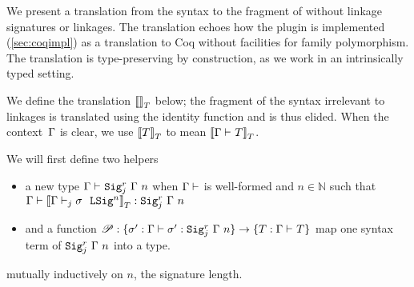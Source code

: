 We present a translation from the \TT syntax to the fragment of \TT without
linkage signatures or linkages.
The translation echoes how the \Lang plugin is implemented (\cref{sec:coqimpl})
as a translation to Coq without facilities for family polymorphism.
The translation is type-preserving by construction, as we work in an
intrinsically typed setting.

%
 


We define the translation $\denotesT{}$ below; the fragment of the syntax
irrelevant to linkages is translated using the identity function and is thus elided.
When the context~$\Gm$ is clear, we use $\denotesT{T}$ to mean $\denotesT{\goodType{\Gamma}{T}{}}$.

We will first define two helpers
\begin{itemize}
  \item a new type $\goodType{\Gamma}{\Sigr{\Gamma}{n}{j}}{}$  when
  $\goodCtx{\Gamma}{}$  is well-formed and $n \in \mathbb{N}$
  such that $\goodTerm{\Gm}{\denotesT{\goodSigU{j}{\Gamma}{\lsig}{n}}}{\Sigr{\Gm}{n}{j}}$
  \item and a function $\mathscr{P} : \{\lsig' : \goodTerm{\Gm}{\lsig'}{\Sigr{\Gm}{n}{j}} \} \to \{ T : \goodType{\Gm}{T}{} \}$ map one syntax term of $\Sigr{\Gm}{n}{j}$ into a type.
\end{itemize}
mutually inductively on $n$, the signature length.

